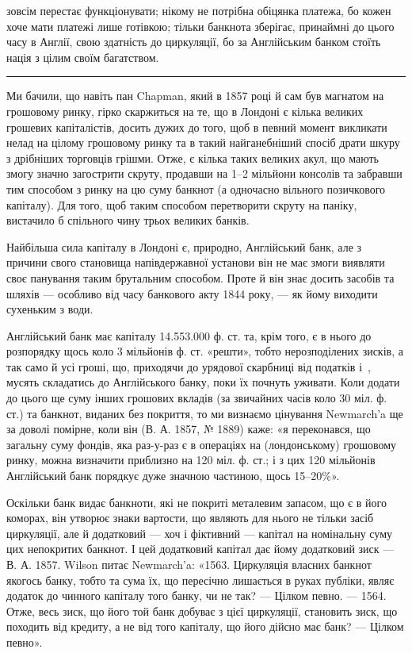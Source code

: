 \parcont{}  %
зовсім перестає функціонувати; нікому не потрібна обіцянка платежа, бо кожен
хоче мати платежі лише готівкою; тільки банкнота зберігає, принаймні до цього
часу в Англії, свою здатність до циркуляції, бо за Англійським банком стоїть
нація з цілим своїм багатством.

\pfbreak

Ми бачили, що навіть пан Chapman, який в 1857 році й сам був магнатом
на грошовому ринку, гірко скаржиться на те, що в Лондоні є кілька великих
грошевих капіталістів, досить дужих до того, щоб в певний момент викликати
нелад на цілому грошовому ринку та в такий найганебніший спосіб драти шкуру
з дрібніших торговців грішми. Отже, є кілька таких великих акул, що мають
змогу значно загострити скруту, продавши на 1--2 мільйони консолів та забравши
тим способом з ринку на цю суму банкнот (а одночасно вільного позичкового
капіталу). Для того, щоб таким способом перетворити скруту на паніку,
вистачило б спільного чину трьох великих банків.

Найбільша сила капіталу в Лондоні є, природно, Англійський банк, але
з причини свого становища напівдержавної установи він не має змоги виявляти
своє панування таким брутальним способом. Проте й він знає досить засобів
та шляхів — особливо від часу банкового акту 1844 року, — як йому виходити
сухеньким з води.

Англійський банк має капіталу 14.553.000 ф. ст. та, крім того, є в нього
до розпорядку щось коло 3 мільйонів ф. ст. «решти», тобто нерозподілених зисків,
а так само й усі гроші, що, приходячи до урядової скарбниці від податків
і~, мусять складатись до Англійського банку, поки їх почнуть уживати.
Коли додати до цього ще суму інших грошових вкладів (за звичайних часів
коло 30 міл. ф. ст.) та банкнот, виданих без покриття, то ми визнаємо цінування
Newmarch’a ще за доволі помірне, коли він (В. А. 1857, № 1889)
каже: «я переконався, що загальну суму фондів, яка раз-у-раз є в операціях
на (лондонському) грошовому ринку, можна визначити приблизно на 120 міл.
ф. ст.; і з цих 120 мільйонів Англійський банк порядкує дуже значною частиною,
щось 15--20\%».

Оскільки банк видає банкноти, які не покриті металевим запасом, що є в його
коморах, він утворює знаки вартости, що являють для нього не тільки засіб циркуляції,
але й додатковий — хоч і фіктивний — капітал на номінальну суму цих непокритих
банкнот. І цей додатковий капітал дає йому додатковий зиск — В. А. 1857.
Wilson питає Newmarch’a: «1563. Циркуляція власних банкнот якогось банку,
тобто та сума їх, що пересічно лишається в руках публіки, являє додаток до
чинного капіталу того банку, чи не так? — Цілком певно. — 1564. Отже, весь
зиск, що його той банк добуває з цієї циркуляції, становить зиск, що походить
від кредиту, а не від того капіталу, що його дійсно має банк? — Цілком певно».

